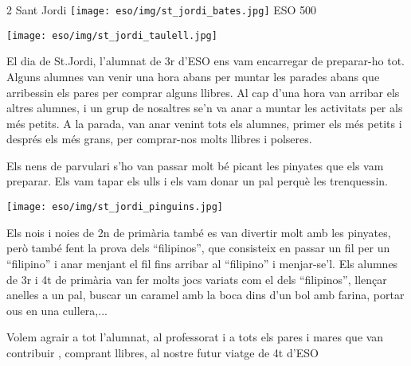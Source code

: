 \begin{news}
{2} %
{Sant Jordi}
{\noindent\texttt{[image: eso/img/st\_jordi\_bates.jpg]}}
{ESO}
{500} %

{\noindent\texttt{[image: eso/img/st\_jordi\_taulell.jpg]}}

El dia de St.Jordi,  l'alumnat de 3r d'ESO ens vam encarregar de preparar-ho tot.
Alguns alumnes van venir una hora abans per muntar les parades abans que arribessin els pares per comprar alguns llibres. Al cap d'una hora van arribar els altres alumnes, i un grup de nosaltres se'n va anar a muntar les activitats per als més petits. 
A la parada, van anar venint tots els alumnes, primer els més petits i després els més grans, per comprar-nos molts llibres i polseres.

Els nens de parvulari s'ho van passar molt bé picant les pinyates que els vam preparar. Els vam tapar els ulls i els vam donar un pal perquè les trenquessin. 

{\noindent\texttt{[image: eso/img/st\_jordi\_pinguins.jpg]}}




Els nois i noies de 2n de primària també es van divertir molt amb les pinyates, però també fent la prova dels “filipinos”, que consisteix en passar un fil per un “filipino” i anar menjant el fil fins arribar al “filipino” i menjar-se'l.
Els alumnes de 3r i 4t de primària van fer molts jocs variats com el dels “filipinos”, llençar anelles a un pal, buscar un caramel amb la boca dins d'un bol amb farina, portar ous en una cullera,...

Volem agrair a tot l'alumnat, al professorat i a tots els pares i mares que van contribuir , comprant llibres,  al nostre futur viatge de 4t d’ESO   

\end{news}
